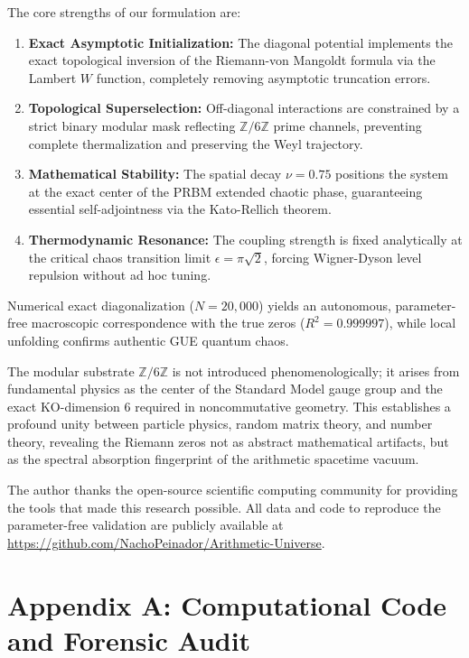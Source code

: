 \documentclass[prl,aps,floatfix,superscriptaddress,10pt]{revtex4-2}
\newcommand{\Zmod}{\mathbb{Z}/6\mathbb{Z}}
\begin{document}
The core strengths of our formulation are:
\begin{enumerate}
    \item \textbf{Exact Asymptotic Initialization:} The diagonal potential implements the exact topological inversion of the Riemann-von Mangoldt formula via the Lambert $W$ function, completely removing asymptotic truncation errors.
    \item \textbf{Topological Superselection:} Off-diagonal interactions are constrained by a strict binary modular mask reflecting $\Zmod$ prime channels, preventing complete thermalization and preserving the Weyl trajectory.
    \item \textbf{Mathematical Stability:} The spatial decay $\nu = 0.75$ positions the system at the exact center of the PRBM extended chaotic phase, guaranteeing essential self-adjointness via the Kato-Rellich theorem.
    \item \textbf{Thermodynamic Resonance:} The coupling strength is fixed analytically at the critical chaos transition limit $\epsilon = \pi \sqrt{2}$, forcing Wigner-Dyson level repulsion without ad hoc tuning.
\end{enumerate}

Numerical exact diagonalization ($N=20,000$) yields an autonomous, parameter-free macroscopic correspondence with the true zeros ($R^2 = 0.999997$), while local unfolding confirms authentic GUE quantum chaos.

The modular substrate $\Zmod$ is not introduced phenomenologically; it arises from fundamental physics as the center of the Standard Model gauge group and the exact KO-dimension 6 required in noncommutative geometry. This establishes a profound unity between particle physics, random matrix theory, and number theory, revealing the Riemann zeros not as abstract mathematical artifacts, but as the spectral absorption fingerprint of the arithmetic spacetime vacuum.

\begin{acknowledgments}
The author thanks the open-source scientific computing community for providing the tools that made this research possible.
All data and code to reproduce the parameter-free validation are publicly available at \url{https://github.com/NachoPeinador/Arithmetic-Universe}.
\end{acknowledgments}

\appendix

\section{Appendix A: Computational Code and Forensic Audit}
\end{document}
